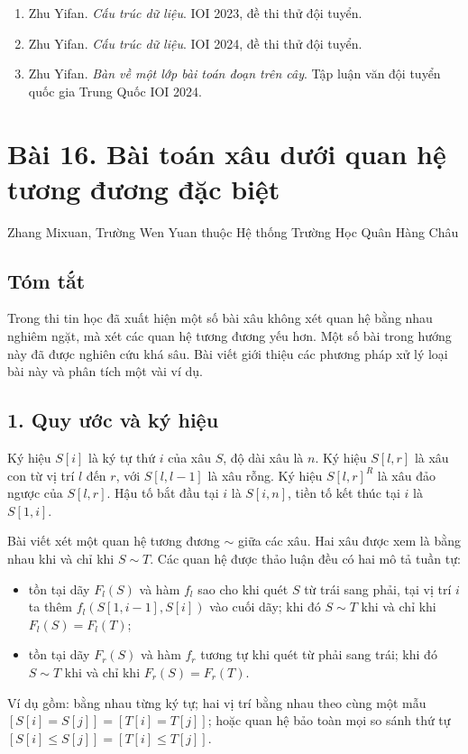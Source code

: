 \documentclass[11pt]{article}
\begin{document}
\begin{enumerate}
  \item Zhu Yifan. \emph{Cấu trúc dữ liệu}. IOI 2023, đề thi thử đội tuyển.
  \item Zhu Yifan. \emph{Cấu trúc dữ liệu}. IOI 2024, đề thi thử đội tuyển.
  \item Zhu Yifan. \emph{Bàn về một lớp bài toán đoạn trên cây}. Tập luận văn
  đội tuyển quốc gia Trung Quốc IOI 2024.
\end{enumerate}

\section*{Bài 16. Bài toán xâu dưới quan hệ tương đương đặc biệt}

\begin{center}
Zhang Mixuan, Trường Wen Yuan thuộc Hệ thống Trường Học Quân Hàng Châu
\end{center}

\subsection*{Tóm tắt}

Trong thi tin học đã xuất hiện một số bài xâu không xét quan hệ bằng nhau
nghiêm ngặt, mà xét các quan hệ tương đương yếu hơn. Một số bài trong hướng
này đã được nghiên cứu khá sâu. Bài viết giới thiệu các phương pháp xử lý loại
bài này và phân tích một vài ví dụ.

\subsection*{1. Quy ước và ký hiệu}

Ký hiệu \(S[i]\) là ký tự thứ \(i\) của xâu \(S\), độ dài xâu là \(n\). Ký hiệu
\(S[l,r]\) là xâu con từ vị trí \(l\) đến \(r\), với \(S[l,l-1]\) là xâu rỗng.
Ký hiệu \(S[l,r]^R\) là xâu đảo ngược của \(S[l,r]\). Hậu tố bắt đầu tại \(i\)
là \(S[i,n]\), tiền tố kết thúc tại \(i\) là \(S[1,i]\).

Bài viết xét một quan hệ tương đương \(\sim\) giữa các xâu. Hai xâu được xem
là bằng nhau khi và chỉ khi \(S\sim T\). Các quan hệ được thảo luận đều có hai
mô tả tuần tự:
\begin{itemize}
  \item tồn tại dãy \(F_l(S)\) và hàm \(f_l\) sao cho khi quét \(S\) từ trái
  sang phải, tại vị trí \(i\) ta thêm \(f_l(S[1,i-1],S[i])\) vào cuối dãy; khi
  đó \(S\sim T\) khi và chỉ khi \(F_l(S)=F_l(T)\);
  \item tồn tại dãy \(F_r(S)\) và hàm \(f_r\) tương tự khi quét từ phải sang
  trái; khi đó \(S\sim T\) khi và chỉ khi \(F_r(S)=F_r(T)\).
\end{itemize}
Ví dụ gồm: bằng nhau từng ký tự; hai vị trí bằng nhau theo cùng một mẫu
\([S[i]=S[j]]=[T[i]=T[j]]\); hoặc quan hệ bảo toàn mọi so sánh thứ tự
\([S[i]\le S[j]]=[T[i]\le T[j]]\).
\end{document}
